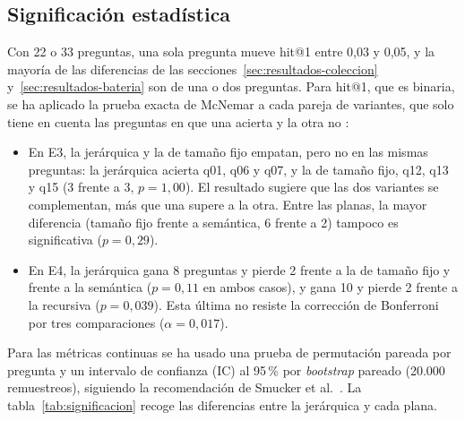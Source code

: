 \subsection{Significación estadística}

Con 22 o 33 preguntas, una sola pregunta mueve hit@1 entre 0,03 y 0,05, y la mayoría de las diferencias de las secciones~\ref{sec:resultados-coleccion} y~\ref{sec:resultados-bateria} son de una o dos preguntas. Para hit@1, que es binaria, se ha aplicado la prueba exacta de McNemar a cada pareja de variantes, que solo tiene en cuenta las preguntas en que una acierta y la otra no \cite{mcnemar1947}:

\begin{itemize}
  \item En E3, la jerárquica y la de tamaño fijo empatan, pero no en las mismas preguntas: la jerárquica acierta q01, q06 y q07, y la de tamaño fijo, q12, q13 y q15 (3 frente a 3, $p = 1{,}00$). El resultado sugiere que las dos variantes se complementan, más que una supere a la otra. Entre las planas, la mayor diferencia (tamaño fijo frente a semántica, 6 frente a 2) tampoco es significativa ($p = 0{,}29$).
  \item En E4, la jerárquica gana 8 preguntas y pierde 2 frente a la de tamaño fijo y frente a la semántica ($p = 0{,}11$ en ambos casos), y gana 10 y pierde 2 frente a la recursiva ($p = 0{,}039$). Esta última no resiste la corrección de Bonferroni por tres comparaciones ($\alpha = 0{,}017$).
\end{itemize}

Para las métricas continuas se ha usado una prueba de permutación pareada por pregunta y un intervalo de confianza (IC) al 95\,\% por \emph{bootstrap} pareado (20.000 remuestreos), siguiendo la recomendación de Smucker et al.\ \cite{smucker2007}. La tabla~\ref{tab:significacion} recoge las diferencias entre la jerárquica y cada plana.


